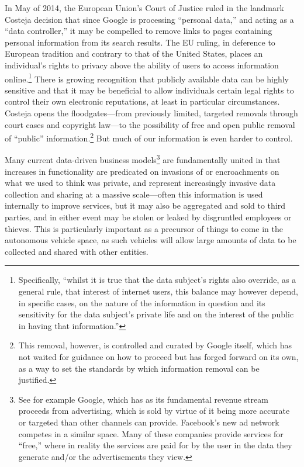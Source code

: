  In May of 2014, the European
Union's Court of Justice 
ruled in the landmark Costeja decision that since Google is processing
``personal data,'' and acting as a ``data controller,'' it may be
compelled to remove links to pages containing personal information
from its search results.\cite{ICO} The EU ruling, in deference to European
tradition and contrary to that of the United States, places an
individual's rights to privacy above the ability of users to access
information online.\footnote{Specifically, ``whilst it is true that the
data subject’s rights also override, as a general rule, that interest
of internet users, this balance may however depend, in specific cases,
on the nature of the information in question and its sensitivity for
the data subject’s private life and on the interest of the public in
having that information.''\cite{COJCosteja}} There is growing recognition that publicly
available data can be highly sensitive and that it may be beneficial
to allow individuals certain legal rights to control their own
electronic reputations, at least in particular circumstances. Costeja
opens the floodgates---from previously limited, targeted removals
through court cases and copyright law---to the possibility of free and
open public removal of ``public'' information.\footnote{This removal,
  however, is controlled and curated by Google itself, which has not
  waited for guidance on how to proceed but has forged forward on its
  own, as a way to set the standards by which information removal can
  be justified.\cite{powlesChaparro}} But much of our
information is even harder to control.

Many current data-driven business models\footnote{See for example
  Google, which has as its fundamental revenue stream proceeds from
  advertising, which is sold by virtue of it being more accurate or
  targeted than other channels can provide. Facebook's new ad network
  competes in a similar space. Many of these companies provide
  services for ``free,'' where in reality the services are paid for by
the user in the data they generate and/or the advertisements they
view.} are fundamentally united in that increases in
functionality are predicated on invasions of or encroachments on what
we used to think was private, and represent increasingly invasive data
collection and sharing at a massive scale---often this information is
used internally to improve services, but it may also be aggregated and
sold to third parties, and in either event may be stolen or leaked by
disgruntled employees or thieves. This
is particularly important as a precursor of things to
come in the autonomous vehicle space, as such vehicles will allow
large amounts of data to be collected and shared with other entities. 

